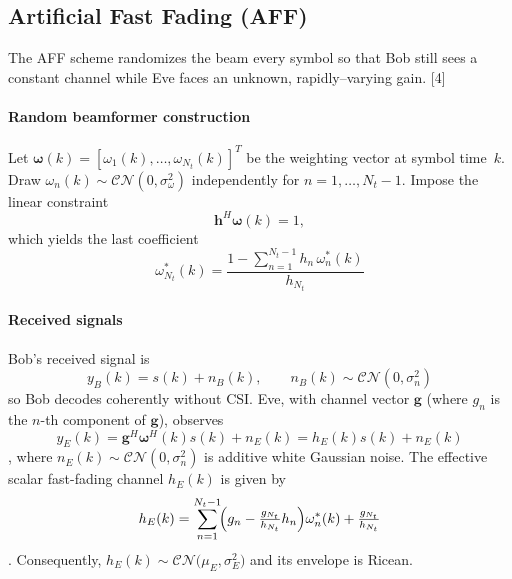 \documentclass[10pt,a4paper]{article} %
\begin{document}
\subsection{Artificial Fast Fading (AFF)}\label{subsec:AFF}

The AFF scheme randomizes the beam every symbol so that Bob still sees a constant channel while Eve faces an unknown, rapidly–varying gain. [4]

\paragraph{Random beamformer construction}
Let $\boldsymbol{\omega}(k)=[\omega_1(k),\dots,\omega_{N_t}(k)]^{\!T}$ be the weighting vector at symbol time~$k$.
Draw $\omega_n(k)\sim\mathcal{CN}(0,\sigma_\omega^{2})$ independently for $n=1,\dots,N_t\!-\!1$.
Impose the linear constraint
\begin{equation}
\mathbf{h}^{H}\boldsymbol{\omega}(k)=1,
\end{equation}
which yields the last coefficient
\begin{equation}
\omega_{N_t}^{*}(k)=\frac{1-\sum_{n=1}^{N_t-1}h_n\,\omega_n^{*}(k)}{h_{N_t}} \label{eq:AFF_last_coef} %
\end{equation}



\paragraph{Received signals}
Bob's received signal is
\begin{equation}
y_{B}(k)=s(k)+n_{B}(k),\qquad n_{B}(k)\sim\mathcal{CN}(0,\sigma_n^{2})
\end{equation}
so Bob decodes coherently without CSI.
Eve, with channel vector $\mathbf{g}$ (where $g_n$ is the $n$-th component of $\mathbf{g}$), observes
\begin{equation}
y_{E}(k)=\mathbf{g}^{H}\boldsymbol{\omega}^{H}(k)s(k)+n_{E}(k)=h_{E}(k)s(k)+n_{E}(k)
\end{equation},
where $n_E(k) \sim \mathcal{CN}(0, \sigma_n^2)$ is additive white Gaussian noise. The effective scalar fast-fading channel $h_E(k)$ is given by
\begin{equation}
h_{E}(k)=\sum_{n=1}^{N_t-1}\!\Bigl(g_{n}-\tfrac{g_{N_t}}{h_{N_t}}h_n\Bigr)\omega_n^{*}(k)+\tfrac{g_{N_t}}{h_{N_t}} \label{eq:AFF_Eve_channel} %
\end{equation}.
Consequently, $h_{E}(k)\sim\mathcal{CN}\!\bigl(\mu_{E},\sigma_{E}^{2}\bigr)$ and its envelope is Ricean.
\end{document}
